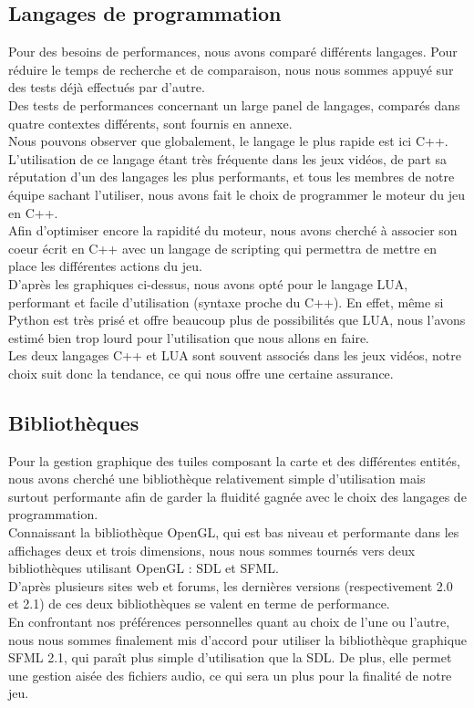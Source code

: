 \documentclass[a4paper]{memoir}
\begin{document}
			\subsection{Langages de programmation}
				Pour des besoins de performances, nous avons comparé différents langages. Pour réduire le temps de recherche et de comparaison, nous nous sommes appuyé sur des tests déjà effectués par d'autre.\\
				Des tests de performances concernant un large panel de langages, comparés dans quatre contextes différents, sont fournis en annexe.\\
				Nous pouvons observer que globalement, le langage le plus rapide est ici C++. L'utilisation de ce langage étant très fréquente dans les jeux vidéos, de part sa réputation d'un des langages les plus performants, et tous les membres de notre équipe sachant l'utiliser, nous avons fait le choix de programmer le moteur du jeu en C++.\\
				Afin d'optimiser encore la rapidité du moteur, nous avons cherché à associer son coeur écrit en C++ avec un langage de scripting qui permettra de mettre en place les différentes actions du jeu.\\ D'après les graphiques ci-dessus, nous avons opté pour le langage LUA, performant et facile d'utilisation (syntaxe proche du C++). En effet, même si Python est très prisé et offre beaucoup plus de possibilités que LUA, nous l'avons estimé bien trop lourd pour l'utilisation que nous allons en faire.\\
				Les deux langages C++ et LUA sont souvent associés dans les jeux vidéos, notre choix suit donc la tendance, ce qui nous offre une certaine assurance.

			\subsection{Bibliothèques}
				Pour la gestion graphique des tuiles composant la carte et des différentes entités, nous avons cherché une bibliothèque relativement simple d'utilisation mais surtout performante afin de garder la fluidité gagnée avec le choix des langages de programmation.\\
				Connaissant la bibliothèque OpenGL, qui est bas niveau et performante dans les affichages deux et trois dimensions, nous nous sommes tournés vers deux bibliothèques utilisant OpenGL : SDL et SFML.\\
				D'après plusieurs sites web et forums, les dernières versions (respectivement 2.0 et 2.1) de ces deux bibliothèques se valent en terme de performance.\\
				En confrontant nos préférences personnelles quant au choix de l'une ou l'autre, nous nous sommes finalement mis d'accord pour utiliser la bibliothèque graphique SFML 2.1, qui paraît plus simple d'utilisation que la SDL. De plus, elle permet une gestion aisée des fichiers audio, ce qui sera un plus pour la finalité de notre jeu.
			
\end{document}
